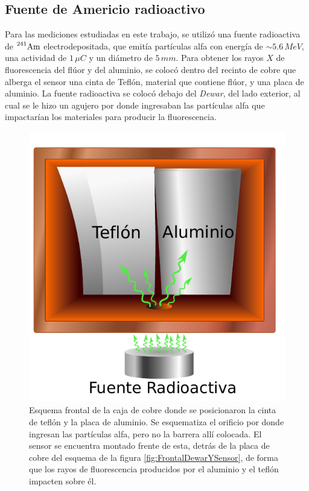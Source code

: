 \subsection{Fuente de Americio radioactivo}
\noindent Para las mediciones estudiadas en este trabajo, se utilizó una fuente radioactiva de $\prescript{241}{}{\mbox{Am}}$ electrodepositada, que emitía partículas alfa con energía de $\sim 5.6\,\si{MeV}$, una actividad de $1\,\si{\mu C}$ y un diámetro de $5\,\si{mm}$. Para obtener los rayos $X$ de fluorescencia del flúor y del aluminio, se colocó dentro del recinto de cobre que alberga el sensor una cinta de Teflón, material que contiene flúor, y una placa de aluminio. La fuente radioactiva se colocó debajo del \textit{Dewar}, del lado exterior, al cual se le hizo un agujero por donde ingresaban las partículas alfa que impactarían los materiales para producir la fluorescencia.
\begin{figure}%
    \centering
    \includegraphics[scale=0.7]{Figs/CajaSensor.pdf}
    \caption{\footnotesize{Esquema frontal de la caja de cobre donde se posicionaron la cinta de teflón y la placa de aluminio. Se esquematiza el orificio por donde ingresan las partículas alfa, pero no la barrera allí colocada. El sensor se encuentra montado frente de esta, detrás de la placa de cobre del esquema de la figura \ref{fig:FrontalDewarYSensor}, de forma que los rayos de fluorescencia producidos por el aluminio y el teflón impacten sobre él.}}
    \label{fig:FrontalAlYF}
\end{figure}
